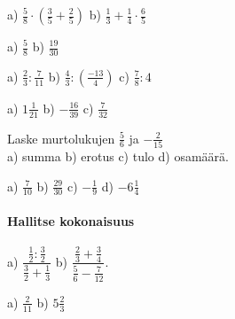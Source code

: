 
\begin{tehtava}
a) $\frac{5}{8}\cdot(\frac{3}{5}+\frac{2}{5})$ \qquad b) $\frac{1}{3}+\frac{1}{4}\cdot\frac{6}{5}$
\begin{vastaus}
a) $\frac{5}{8}$ \qquad b) $\frac{19}{30}$
\end{vastaus}
\end{tehtava}


\begin{tehtava}
a) $\frac{2}{3} : \frac{7}{11}$ \qquad b) $\frac{4}{3}:(\frac{-13}{4})$ \qquad c) $\frac{7}{8}:4$
\begin{vastaus}
a) $1\frac{1}{21}$ \qquad b) $-\frac{16}{39}$ \qquad c) $\frac{7}{32}$
\end{vastaus}
\end{tehtava}

\begin{tehtava}
Laske murtolukujen $\frac{5}{6}$ ja $-\frac{2}{15}$ \\ a) summa \qquad b) erotus \qquad c) tulo \qquad d) osamäärä.
\begin{vastaus}
a) $\frac{7}{10}$ \qquad b) $\frac{29}{30}$ \qquad c) $-\frac{1}{9}$ \qquad d) $-6\frac{1}{4}$
\end{vastaus}
\end{tehtava}

\paragraph*{Hallitse kokonaisuus}

\begin{tehtava}
a) $\dfrac{\frac{1}{2}:\frac{3}{2}}{\frac{3}{2}+\frac{1}{3}}$ \qquad b) $\dfrac{\frac{2}{3}+\frac{3}{4}}{\frac{5}{6}-\frac{7}{12}}$.
\begin{vastaus}
a) $\frac{2}{11}$ \qquad b) $5\frac{2}{3}$
\end{vastaus}
\end{tehtava}

